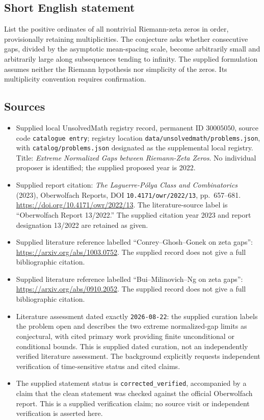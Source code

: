 \documentclass[11pt]{article}
\begin{document}
\subsection{Short English statement}
List the positive ordinates of all nontrivial Riemann-zeta zeros in order, provisionally retaining multiplicities. The conjecture asks whether consecutive gaps, divided by the asymptotic mean-spacing scale, become arbitrarily small and arbitrarily large along subsequences tending to infinity. The supplied formulation assumes neither the Riemann hypothesis nor simplicity of the zeros. Its multiplicity convention requires confirmation.
\subsection{Sources}
\begin{itemize}
\item Supplied local UnsolvedMath registry record, permanent ID \(30005050\), source code \texttt{catalogue entry}; registry location \texttt{data/unsolvedmath/problems.json}, with \texttt{catalog/problems.json} designated as the supplemental local registry. Title: \emph{Extreme Normalized Gaps between Riemann-Zeta Zeros}. No individual proposer is identified; the supplied proposed year is 2022.
\item Supplied report citation: \emph{The Laguerre-P\'olya Class and Combinatorics} (2023), Oberwolfach Reports, DOI \texttt{10.4171/owr/2022/13}, pp.\ 657--681. \url{https://doi.org/10.4171/owr/2022/13}. The literature-source label is ``Oberwolfach Report 13/2022.'' The supplied citation year 2023 and report designation 13/2022 are retained as given.
\item Supplied literature reference labelled ``Conrey--Ghosh--Gonek on zeta gaps'': \url{https://arxiv.org/abs/1003.0752}. The supplied record does not give a full bibliographic citation.
\item Supplied literature reference labelled ``Bui--Milinovich--Ng on zeta gaps'': \url{https://arxiv.org/abs/0910.2052}. The supplied record does not give a full bibliographic citation.
\item Literature assessment dated exactly \texttt{2026-08-22}: the supplied curation labels the problem open and describes the two extreme normalized-gap limits as conjectural, with cited primary work providing finite unconditional or conditional bounds. This is supplied dated curation, not an independently verified literature assessment. The background explicitly requests independent verification of time-sensitive status and cited claims.
\item The supplied statement status is \texttt{corrected\_verified}, accompanied by a claim that the clean statement was checked against the official Oberwolfach report. This is a supplied verification claim; no source visit or independent verification is asserted here.
\end{itemize}
\end{document}
